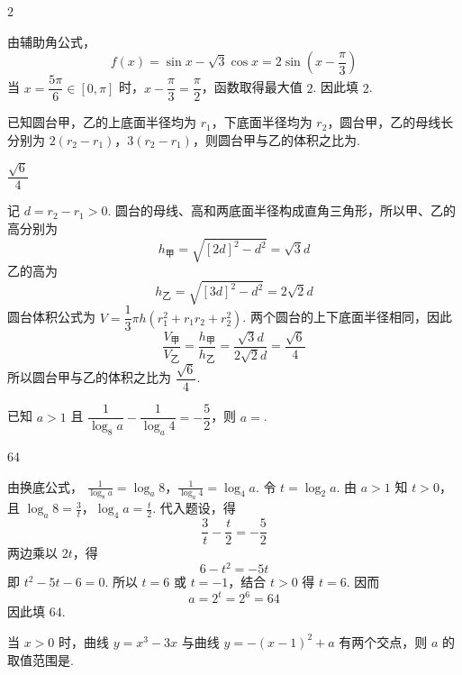 \begin{answer}
2
\end{answer}

\begin{solution}
由辅助角公式，
\[
f(x)=\sin x-\sqrt3\cos x=2\sin\left(x-\frac\pi3\right)
\]
当 \(x=\dfrac{5\pi}{6}\in[0,\pi]\) 时，\(x-\dfrac\pi3=\dfrac\pi2\)，函数取得最大值 \(2\). 因此填 \(2\).
\end{solution}

\begin{problem}
已知圆台甲，乙的上底面半径均为 \(r_1\)，下底面半径均为 \(r_2\)，圆台甲，乙的母线长分别为 \(2(r_2-r_1)\)，\(3(r_2-r_1)\)，则圆台甲与乙的体积之比为\fillinblank{}.
\end{problem}

\begin{answer}
\(\dfrac{\sqrt6}{4}\)
\end{answer}

\begin{solution}
记 \(d=r_2-r_1>0\). 圆台的母线、高和两底面半径构成直角三角形，所以甲、乙的高分别为
\[
h_{\text{甲}}=\sqrt{[2d]^2-d^2}=\sqrt3d
\]
乙的高为
\[
h_{\text{乙}}=\sqrt{[3d]^2-d^2}=2\sqrt2d
\]
圆台体积公式为 \(V=\dfrac13\pi h(r_1^2+r_1r_2+r_2^2)\). 两个圆台的上下底面半径相同，因此
\[
\frac{V_{\text{甲}}}{V_{\text{乙}}}=\frac{h_{\text{甲}}}{h_{\text{乙}}}=\frac{\sqrt3d}{2\sqrt2d}=\frac{\sqrt6}{4}
\]
所以圆台甲与乙的体积之比为 \(\dfrac{\sqrt6}{4}\).
\end{solution}

\begin{problem}
已知 \(a>1\) 且 \(\dfrac1{\log_8a}-\dfrac1{\log_a4}=-\dfrac52\)，则 \(a=\)\fillinblank{}.
\end{problem}

\begin{answer}
64
\end{answer}

\begin{solution}
由换底公式，
\(\frac1{\log_8a}=\log_a8\)，\(\frac1{\log_a4}=\log_4a\).
令 \(t=\log_2a\). 由 \(a>1\) 知 \(t>0\)，且
\(\log_a8=\frac3t\)，\(\log_4a=\frac t2\).
代入题设，得
\[
\frac3t-\frac t2=-\frac52
\]
两边乘以 \(2t\)，得
\[
6-t^2=-5t
\]
即 \(t^2-5t-6=0\). 所以 \(t=6\) 或 \(t=-1\)，结合 \(t>0\) 得 \(t=6\). 因而
\[
a=2^t=2^6=64
\]
因此填 \(64\).
\end{solution}

\begin{problem}
当 \(x>0\) 时，曲线 \(y=x^3-3x\) 与曲线 \(y=-(x-1)^2+a\) 有两个交点，则 \(a\) 的取值范围是\fillinblank{}.
\end{problem}

